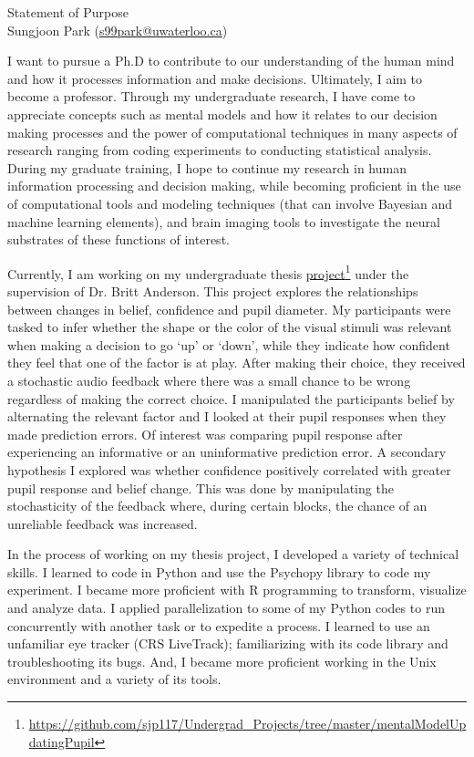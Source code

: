\documentclass[12pt]{article}
\let\oldcenter\center
\let\oldendcenter\endcenter
\renewenvironment{center}{\setlength\topsep{-1pt}\oldcenter}{\oldendcenter}
\begin{document}
	
	\begin{center}
		{\Large Statement of Purpose} \\
		{\normalsize Sungjoon Park (\href{mailto:s99park@uwaterloo.ca}{s99park@uwaterloo.ca})}
	\end{center}
	
		I want to pursue a Ph.D to contribute to our understanding of the human mind and how it processes information and make decisions. Ultimately, I aim to become a professor. Through my undergraduate research, I have come to appreciate concepts such as mental models and how it relates to our decision making processes and the power of computational techniques in many aspects of research ranging from coding experiments to conducting statistical analysis. During my graduate training, I hope to continue my research in human information processing and decision making, while becoming proficient in the use of computational tools and modeling techniques (that can involve Bayesian and machine learning elements), and brain imaging tools to investigate the neural substrates of these functions of interest.
	
	Currently, I am working on my undergraduate thesis \href{https://github.com/sjp117/Undergrad_Projects/tree/master/mentalModelUpdatingPupil}{project}\footnote{\url{https://github.com/sjp117/Undergrad\_Projects/tree/master/mentalModelUpdatingPupil}} under the supervision of Dr. Britt Anderson. This project explores the relationships between changes in belief, confidence and pupil diameter. My participants were tasked to infer whether the shape or the color of the visual stimuli was relevant when making a decision to go `up' or `down', while they indicate how confident they feel that one of the factor is at play. After making their choice, they received a stochastic audio feedback where there was a small chance to be wrong regardless of making the correct choice. I manipulated the participants belief by alternating the relevant factor and I looked at their pupil responses when they made prediction errors. Of interest was comparing pupil response after experiencing an informative or an uninformative prediction error. A secondary hypothesis I explored was whether confidence positively correlated with greater pupil response and belief change. This was done by manipulating the stochasticity of the feedback where, during certain blocks, the chance of an unreliable feedback was increased.
	
	In the process of working on my thesis project, I developed a variety of technical skills. I learned to code in Python and use the Psychopy library to code my experiment. I became more proficient with R programming to transform, visualize and analyze data. I applied parallelization to some of my Python codes to run concurrently with another task or to expedite a process. I learned to use an unfamiliar eye tracker (CRS LiveTrack); familiarizing with its code library and troubleshooting its bugs. And, I became more proficient working in the Unix environment and a variety of its tools. 
	
\end{document}
